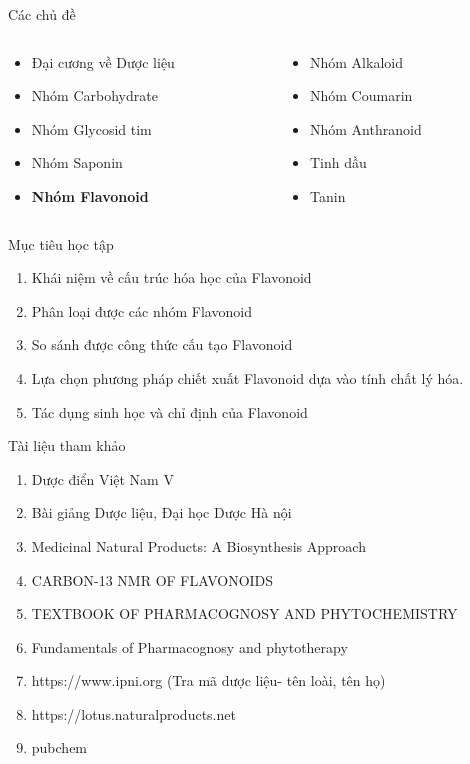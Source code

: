 \documentclass[11pt]{beamer}
\begin{document}
\begin{frame}{Các chủ đề}
	\begin{columns}
		\begin{column}{0.5\textwidth}
			\begin{itemize}
				\item Đại cương về Dược liệu 
				\item Nhóm Carbohydrate
				\item Nhóm Glycosid tim
				\item Nhóm Saponin 
				\item {\bf Nhóm Flavonoid}
			\end{itemize}
		\end{column}
		\begin{column}{0.5\textwidth}
			\begin{itemize}
				\item Nhóm Alkaloid
				\item Nhóm Coumarin 
				\item Nhóm Anthranoid 
				\item Tinh dầu 
				\item Tanin 
			\end{itemize}
		\end{column}
		\end{columns}
\end{frame}

\begin{frame}{Mục tiêu học tập}
\begin{enumerate}
\item Khái niệm về cấu trúc hóa học của Flavonoid
\item Phân loại được các nhóm Flavonoid
\item So sánh được công thức cấu tạo Flavonoid
\item Lựa chọn phương pháp chiết xuất Flavonoid dựa vào tính chất lý hóa.
\item Tác dụng sinh học và chỉ định của Flavonoid
\end{enumerate}
\end{frame}
\begin{frame}{Tài liệu tham khảo}
	\begin{enumerate}
		\item Dược điển Việt Nam V
		\item Bài giảng Dược liệu, Đại học Dược Hà nội
		\item Medicinal Natural Products: A Biosynthesis Approach
		\item CARBON-13 NMR OF FLAVONOIDS
		\item TEXTBOOK OF PHARMACOGNOSY AND PHYTOCHEMISTRY
		\item Fundamentals of Pharmacognosy and phytotherapy
		\item https://www.ipni.org (Tra mã dược liệu- tên loài, tên họ)
		\item https://lotus.naturalproducts.net
		\item pubchem
	\end{enumerate}
\end{frame}
\end{document}
